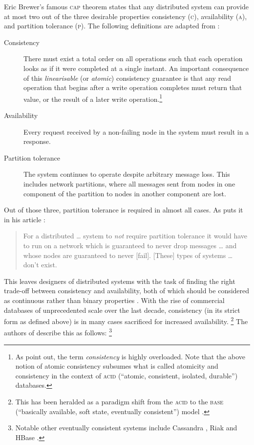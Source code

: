 \documentclass[11pt,chapterprefix=true,toc=bibliography,numbers=noendperiod,
               footnotes=multiple,twoside]{scrreprt}
\begin{document}
Eric Brewer's famous \textsc{cap} theorem states that any distributed system can provide at most two out of the three desirable properties consistency (\textsc{c}), availability (\textsc{a}), and partition tolerance (\textsc{p}).\autocite{cap} The following definitions are adapted from \textcite{capproof}:

\begin{description}
    \item[Consistency] There must exist a total order on all operations such that each operation looks as if it were completed at a single instant. An important consequence of this \emph{linearisable} (or \emph{atomic}) consistency guarantee is that any read operation that begins after a write operation completes must return that value, or the result of a later write operation.\footnote{As \textcite{capproof} point out, the term \emph{consistency} is highly overloaded. Note that the above notion of atomic consistency subsumes what is called atomicity and consistency in the context of \textsc{acid} (\enquote{atomic, consistent, isolated, durable}) databases.}
    \item[Availability] Every request received by a non-failing node in the system must result in a response.
    \item[Partition tolerance] The system continues to operate despite arbitrary message loss. This includes network partitions, where all messages sent from nodes in one component of the partition to nodes in another component are lost.
\end{description}

Out of those three, partition tolerance is required in almost all cases. As \citeauthor{needp} puts it in his article :

\begin{quote}
    For a distributed \dots{} system to \emph{not} require partition tolerance it would have to run on a network which is guaranteed to never drop messages \dots{} and whose nodes are guaranteed to never [fail]. [These] types of systems \dots{} don't exist.
\end{quote}

This leaves designers of distributed systems with the task of finding the right trade-off between consistency and availability, both of which should be considered as continuous rather than binary properties \autocite{cap12}. With the rise of commercial databases of unprecedented scale over the last decade, consistency (in its strict form as defined above) is in many cases sacrificed for increased availability.%
\footnote{This has been heralded as a paradigm shift from the \textsc{acid} to the \textsc{base} (\enquote{basically available, soft state, eventually consistent}) model \parencite{base}.} %
The authors of  describe this as follows:%
\footnote{Notable other eventually consistent systems include Cassandra , Riak  and HBase .}
\end{document}

